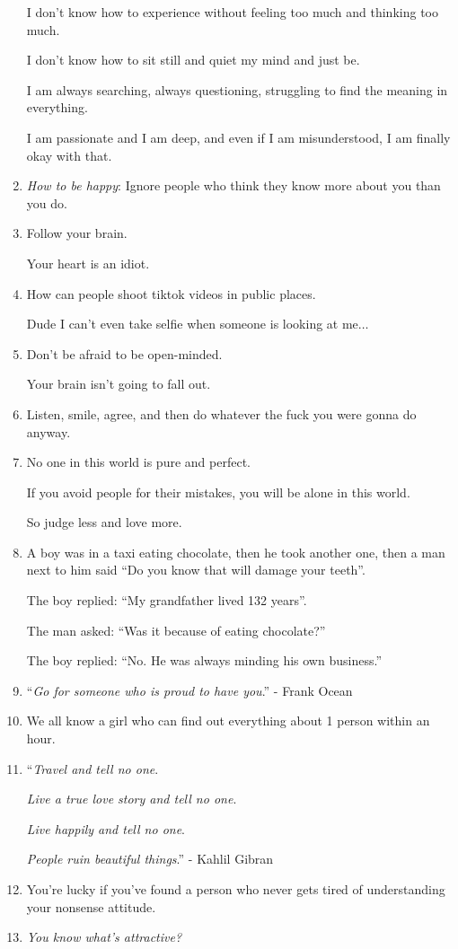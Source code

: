 \documentclass{article}
\begin{document}
\begin{enumerate}
	I don't know how to experience without feeling too much and thinking too much.
	
	I don't know how to sit still and quiet my mind and just be.
	
	I am always searching, always questioning, struggling to find the meaning in everything.
	
	I am passionate and I am deep, and even if I am misunderstood, I am finally okay with that.
	\item \textit{How to be happy}: Ignore people who think they know more about you than you do.
	\item Follow your brain.
	
	Your heart is an idiot.
	\item How can people shoot tiktok videos in public places.
	
	Dude I can't even take selfie when someone is looking at me$\ldots$
	\item Don't be afraid to be open-minded.
	
	Your brain isn't going to fall out.
	\item Listen, smile, agree, and then do whatever the fuck you were gonna do anyway.
	\item No one in this world is pure and perfect.
	
	If you avoid people for their mistakes, you will be alone in this world.
	
	So judge less and love more.
	\item A boy was in a taxi eating chocolate, then he took another one, then a man next to him said ``Do you know that will damage your teeth''.
	
	The boy replied: ``My grandfather lived 132 years''.
	
	The man asked: ``Was it because of eating chocolate?''
	
	The boy replied: ``No. He was always minding his own business.''
	\item ``\textit{Go for someone who is proud to have you}.'' - Frank Ocean
	\item We all know a girl who can find out everything about 1 person within an hour.
	\item ``\textit{Travel and tell no one}.
	
	\textit{Live a true love story and tell no one}.
	
	\textit{Live happily and tell no one}.
	
	\textit{People ruin beautiful things}.'' - Kahlil Gibran
	\item You're lucky if you've found a person who never gets tired of understanding your nonsense attitude.
	\item \textit{You know what's attractive?}
	

\end{enumerate}
\end{document}
